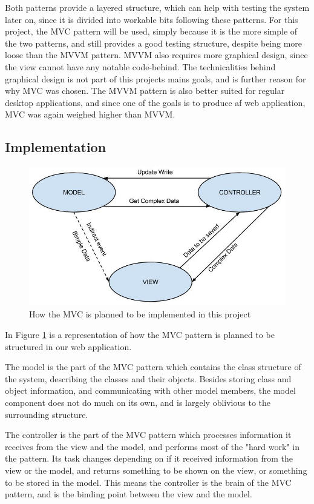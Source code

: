 Both patterns provide a layered structure, which can help with testing the system later on, since it is divided into workable bits following these patterns. For this project, the MVC pattern will be used, simply because it is the more simple of the two patterns, and still provides a good testing structure, despite being more loose than the MVVM pattern. MVVM also requires more graphical design, since the view cannot have any notable code-behind. The technicalities behind graphical design is not part of this projects mains goals, and is further reason for why MVC was chosen. The MVVM pattern is also better suited for regular desktop applications, and since one of the goals is to produce af web application, MVC was again weighed higher than MVVM.

\subsection{Implementation}

\begin{figure}[htb]
\centering
\includegraphics[width=1\textwidth]{Images/MVC.jpg}
\caption{How the MVC is planned to be implemented in this project}
\label{MVC}
\end{figure}

In Figure \ref{MVC} is a representation of how the MVC pattern is planned to be structured in our web application.

The model is the part of the MVC pattern which contains the class structure of the system, describing the classes and their objects. Besides storing class and object information, and communicating with other model members, the model component does not do much on its own, and is largely oblivious to the surrounding structure.

The controller is the part of the MVC pattern which processes information it receives from the view and the model, and performs most of the "hard work" in the pattern. Its task changes depending on if it received information from the view or the model, and returns something to be shown on the view, or something to be stored in the model. This means the controller is the brain of the MVC pattern, and is the binding point between the view and the model.


